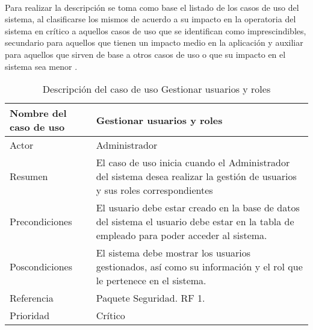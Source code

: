 \paragraph{}Para realizar la descripción se toma como base el listado de los casos de uso del sistema, al clasificarse los mismos de acuerdo a su impacto en la operatoria del sistema en crítico a aquellos casos de uso que se identifican como imprescindibles, secundario para aquellos que tienen un impacto medio en la aplicación y auxiliar para aquellos que sirven de base a otros casos de uso o que su impacto en el sistema sea menor \cite{jacobson_casos_2013}.

\begin{table}[H]
	\sf
	\begin{supertabular}{|p{4.5cm}|p{12cm}|}
		\hline
		\textbf{Nombre del caso de uso}
		& \textbf{Gestionar usuarios y roles} \\ \hline
		
		Actor
		& Administrador \\ \hline
		
		Resumen
		& El caso de uso inicia cuando el Administrador del sistema desea realizar la gestión de usuarios y sus roles correspondientes \\ \hline
		
		Precondiciones
		& El usuario debe estar creado en la base de datos del sistema el usuario debe estar en la tabla de empleado para poder acceder al sistema. \\ \hline
		
		Poscondiciones
		& El sistema debe mostrar los usuarios gestionados, así como su información y el rol que le pertenece en el sistema. \\ \hline
		
		Referencia
		& Paquete Seguridad. RF 1. \\ \hline

		Prioridad
		& Crítico \\		
		\hline
	\end{supertabular}
	\caption[Descripción del caso de uso Gestionar usuarios y roles]{Descripción del caso de uso Gestionar usuarios y roles}
	\label{table:GestUsers}
\end{table}

